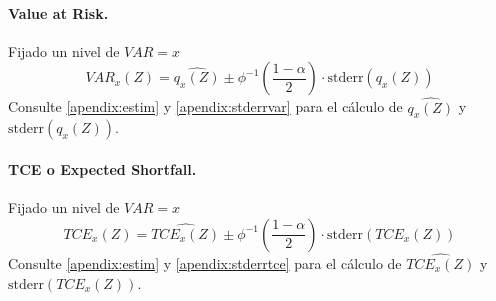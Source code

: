 \paragraph{Value at Risk.} Fijado un nivel de $VAR = x$
\begin{displaymath}
VAR_{x}(Z) = \widehat{q_{x}(Z)} \pm \phi^{-1}\left(\frac{1-\alpha}{2}\right) \cdot \textrm{stderr}(q_{x}(Z))
\end{displaymath}
Consulte \ref{apendix:estim} y \ref{apendix:stderrvar} para el c\'alculo de
$\widehat{q_{x}(Z)}$ y $\textrm{stderr}(q_{x}(Z))$.

\paragraph{TCE o Expected Shortfall.}
Fijado un nivel de $VAR = x$
\begin{displaymath}
TCE_{x}(Z) = \widehat{TCE_{x}(Z)} \pm \phi^{-1}\left(\frac{1-\alpha}{2}\right) \cdot \textrm{stderr}(TCE_{x}(Z))
\end{displaymath}
Consulte \ref{apendix:estim} y \ref{apendix:stderrtce} para el c\'alculo de
$\widehat{TCE_{x}(Z)}$ y $\textrm{stderr}(TCE_{x}(Z))$.
